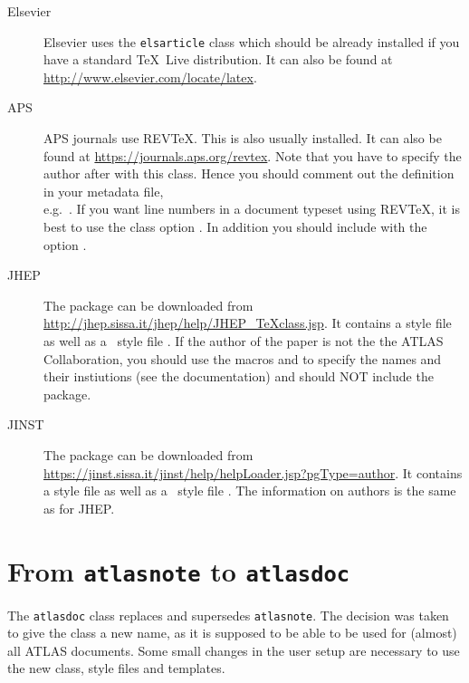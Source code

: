 \begin{description}
\item[Elsevier]Elsevier uses the \texttt{elsarticle} class which should be already installed if you have a standard 
  \TeX\ Live distribution. 
  It can also be found at \url{http://www.elsevier.com/locate/latex}.
  
\item[APS]APS journals use REV\TeX. This is also usually installed.
  It can also be found at \url{https://journals.aps.org/revtex}.
  Note that you have to specify the author after \verb|| with this class.
  Hence you should comment out the definition in your metadata file,\\
  e.g.\ .
  If you want line numbers in a document typeset using REV\TeX, it is best to use the class option .
  In addition you should include  with the option .
  
\item[JHEP]The package can be downloaded from \url{http://jhep.sissa.it/jhep/help/JHEP_TeXclass.jsp}.
  It contains a style file  as well as a \BibTeX\ style file . 
  If the author of the paper is not the the ATLAS Collaboration,
  you should use the macros  and  to specify the names and their instiutions (see the documentation)
  and should NOT include the  package.

\item[JINST]The package can be downloaded from \url{https://jinst.sissa.it/jinst/help/helpLoader.jsp?pgType=author}.
  It contains a style file  as well as a \BibTeX\ style file .
  The information on authors is the same as for JHEP.
\end{description}


\section{From \texttt{atlasnote} to \texttt{atlasdoc}}
\label{sec:oldnote}

The \texttt{atlasdoc} class replaces and supersedes \texttt{atlasnote}.
The decision was taken to give the class a new name, as it is supposed to be
able to be used for (almost) all ATLAS documents.
Some small changes in the user setup are necessary to use the new
class, style files and templates.

